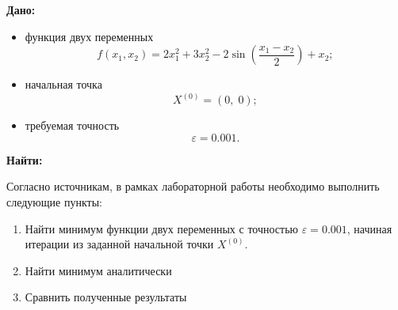 \textbf{Дано:}
\begin{itemize}
    \item функция двух переменных
          \[
              f(x_1, x_2) = 2x_1^2 + 3x_2^2 - 2\sin\left(\frac{x_1 - x_2}{2}\right) + x_2;
          \]
    \item начальная точка
          \[
              X^{(0)} = (0,\;0);
          \]
    \item требуемая точность
          \[
              \varepsilon = 0.001.
          \]
\end{itemize}

\textbf{Найти:}

Согласно источникам, в рамках лабораторной работы необходимо выполнить следующие пункты:

\begin{enumerate}
    \item Найти минимум функции двух переменных с точностью $\varepsilon = 0.001$, начиная итерации из заданной начальной точки $X^{(0)}$.
    \item Найти минимум аналитически
    \item Сравнить полученные результаты
\end{enumerate}
